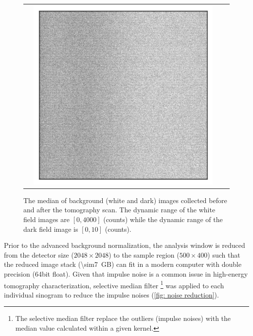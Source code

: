 \documentclass[12pt]{scrartcl}
\newcommand{\myscale}{1}
\begin{document}
\begin{figure}[htp]
\begin{tabular}{cccc}
& \includegraphics[scale=\myscale]{darkField_pst}
\end{tabular}
\caption{
The median of background (white and dark) images collected before and after the tomography scan.
The dynamic range of the white field images are $[0,4000]$ (counts) while the dynamic range of the dark field image is $[0,10]$ (counts).
}\label{fig: flat field images}
\end{figure}

Prior to the advanced background normalization, the analysis window is reduced from the detector size ($2048\times2048$) to the sample region ($500\times400$) such that the reduced image stack (\SI{\sim7}{GB}) can fit in a modern computer with double precision (64bit float).
Given that impulse noise is a common issue in high-energy tomography characterization, selective median filter
\footnote{
The selective median filter replace the outliers (impulse noises) with the median value calculated within a given kernel.
} 
was applied to each individual sinogram to reduce the impulse noises (\cref{fig: noise reduction}).
\end{document}
